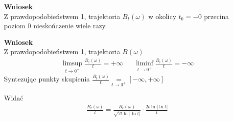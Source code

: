 \textbf{Wniosek}\\
Z prawdopodobieństwem 1, trajektoria $ B_t(\omega) $ w okolicy $ t_0=-0 $ przecina poziom 0 nieskończenie wiele razy.

\textbf{Wniosek}\\
Z prawdopodobieństwem 1, trajektoria $ B(\omega) $
\begin{align*}
\limsup_{t\to0^+}\frac{B_t(\omega)}{t}=+\infty
&&
\liminf_{t\to0^+}\frac{B_t(\omega)}{t}=-\infty
\end{align*}
Syntezując punkty skupienia $ \frac{B_t(\omega)}{t}\underset{t\to 0^+}{=}[-\infty ,+\infty ] $

Widać
\begin{gather*}
\frac{B_t(\omega)}{t}=
\frac{B_t(\omega)}{\sqrt{2t\ln\left|\ln t\right|}}\cdot \frac{2t\ln\left|\ln t\right|}{t}
\end{gather*}
